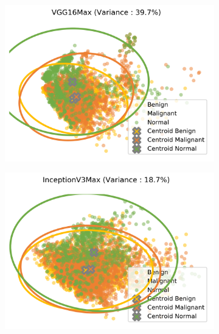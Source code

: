 \begin{figure}[H]
    \begin{subfigure}{.2\textwidth}
      \includegraphics[width=\textwidth]{contents/chapter_4/resources/visualisation_transfer_VGG16Max.png}
    \end{subfigure}
    \begin{subfigure}{.2\textwidth}
      \includegraphics[width=\textwidth]{contents/chapter_4/resources/visualisation_transfer_InceptionV3Max.png}
    \end{subfigure}
    \begin{subfigure}{.2\textwidth}

\end{subfigure}
\end{figure}
